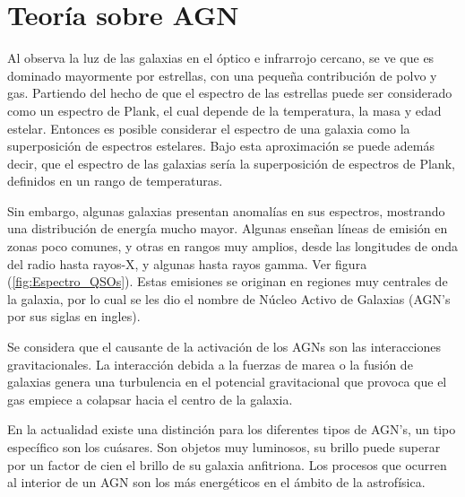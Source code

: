 \begin{savequote}[50mm]
\end{savequote}




\chapter{Teoría sobre AGN}
\label{cha:Theoretical Framework}


Al observa la luz de las galaxias en el óptico e infrarrojo cercano, se ve que es dominado mayormente por estrellas, con una pequeña contribución de polvo y gas. Partiendo del hecho de que el espectro de las estrellas puede ser considerado como un espectro de Plank, el cual depende de la temperatura, la masa y edad estelar. Entonces es posible considerar el espectro de una galaxia como la superposición de espectros  estelares. Bajo esta aproximación se puede además decir, que el espectro de las galaxias sería la superposición de espectros de Plank, definidos en un rango de temperaturas. 

Sin embargo, algunas galaxias presentan anomalías en sus espectros,  mostrando una distribución de energía mucho mayor. Algunas enseñan líneas de emisión en zonas poco comunes, y otras en rangos muy amplios, desde las longitudes de onda del radio hasta rayos-X, y algunas hasta rayos gamma. Ver figura (\ref{fig:Espectro_QSOs}). Estas emisiones se originan en regiones muy centrales de la galaxia, por lo cual se les dio el nombre de Núcleo Activo de Galaxias (AGN's por sus siglas en ingles).

Se considera que el causante de la activación de los AGNs son las interacciones gravitacionales. La interacción debida a la fuerzas de marea o la fusión de galaxias genera una turbulencia en el potencial gravitacional que provoca que el gas empiece a colapsar hacia el centro de la galaxia. 

En la actualidad existe una distinción para los diferentes tipos de  AGN's, un tipo específico son los cuásares. Son objetos muy luminosos, su brillo puede superar por un factor de cien el brillo de su galaxia anfitriona. Los procesos que ocurren al interior de un AGN son los más energéticos en el ámbito de la astrofísica. 


